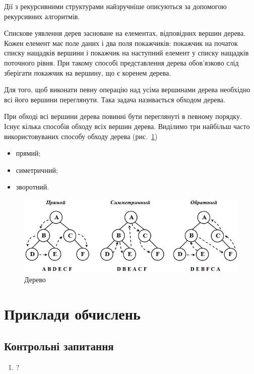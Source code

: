 Дії з рекурсивними структурами найзручніше описуються за допомогою рекурсивних алгоритмів.

Спискове уявлення дерев засноване на елементах, відповідних вершин дерева. Кожен елемент має поле даних і два поля покажчиків: покажчик на початок списку нащадків вершини і покажчик на наступний елемент у списку нащадків поточного рівня. При такому способі представлення дерева обов'язково слід зберігати покажчик на вершину, що є коренем дерева.

Для того, щоб виконати певну операцію над усіма вершинами дерева необхідно всі його вершини переглянути. Така задача називається обходом дерева.

При обході всі вершини дерева повинні бути переглянуті в певному порядку. Існує кілька способів обходу всіх вершин дерева. Виділимо три найбільш часто використовуваних способу обходу дерева (рис.~\ref{f:tree1})

\begin{itemize}
\item прямий;
\item симетричний;
\item зворотний.
\end{itemize}
    
\begin{figure}
\caption{Дерево}\label{f:tree1}
\includegraphics[width=13cm]{pic/31_02.png}

\end{figure}

\section{Приклади обчислень}
\nopagebreak[4]




\subsection*{Контрольні запитання}
\nopagebreak[4]
\begin{enumerate}
\item ?
\end{enumerate}



